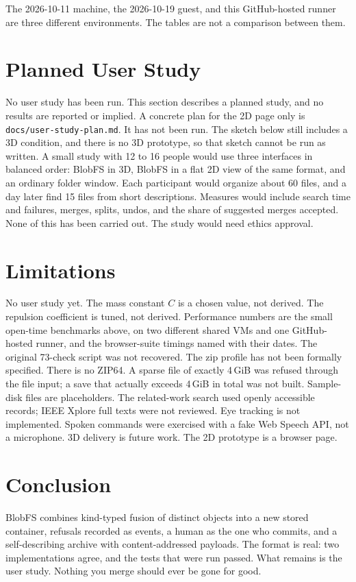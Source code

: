 \documentclass[11pt]{article}
\begin{document}
The 2026-10-11 machine, the 2026-10-19 guest, and this GitHub-hosted runner are three different environments.
The tables are not a comparison between them.

\section{Planned User Study}

No user study has been run.
This section describes a planned study, and no results are reported or implied.
A concrete plan for the 2D page only is \texttt{docs/user-study-plan.md}.
It has not been run.
The sketch below still includes a 3D condition, and there is no 3D prototype, so that sketch cannot be run as written.
A small study with 12 to 16 people would use three interfaces in balanced order: BlobFS in 3D, BlobFS in a flat 2D view of the same format, and an ordinary folder window.
Each participant would organize about 60 files, and a day later find 15 files from short descriptions.
Measures would include search time and failures, merges, splits, undos, and the share of suggested merges accepted.
None of this has been carried out.
The study would need ethics approval.

\section{Limitations}

No user study yet.
The mass constant $C$ is a chosen value, not derived.
The repulsion coefficient is tuned, not derived.
Performance numbers are the small open-time benchmarks above, on two different shared VMs and one GitHub-hosted runner, and the browser-suite timings named with their dates.
The original 73-check script was not recovered.
The zip profile has not been formally specified.
There is no ZIP64.
A sparse file of exactly 4\,GiB was refused through the file input; a save that actually exceeds 4\,GiB in total was not built.
Sample-disk files are placeholders.
The related-work search used openly accessible records; IEEE Xplore full texts were not reviewed.
Eye tracking is not implemented.
Spoken commands were exercised with a fake Web Speech API, not a microphone.
3D delivery is future work.
The 2D prototype is a browser page.

\section{Conclusion}

BlobFS combines kind-typed fusion of distinct objects into a new stored container, refusals recorded as events, a human as the one who commits, and a self-describing archive with content-addressed payloads.
The format is real: two implementations agree, and the tests that were run passed.
What remains is the user study.
Nothing you merge should ever be gone for good.



\end{document}
